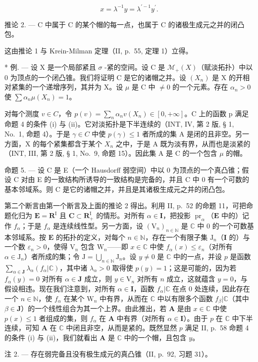 \[
x = \lambda^ {- 1} y = \lambda^ {\prime - 1} y ^ {\prime}.
\]

推论 2. --- C 中属于 C 的某个帽的每一点，也属于 C 的诸极生成元之并的闭凸包。

这由推论 1 与 Krein-Milman 定理（II, p.~55, 定理 1）立得。

* 例. --- 设 X 是一个局部紧且 \(\sigma\) -紧的空间。设 C 是 \(\mathcal{M}_{+}(X)\)（赋淡拓扑）中以 0 为顶点的一个闭凸锥。我们将证明 C 是它的诸帽之并。设 \((X_{n})\) 是 X 的开相对紧集的一个递增序列，其并为 X。设 \(\mu\) 是 C 中 \(\neq 0\) 的一个元素。存在 \(\alpha_{n} > 0\) 使 \(\sum \alpha_{n}\mu(X_{n}) = 1\)。

对每个测度 \(v \in C\)，令 \(p(v) = \sum_{n} \alpha_{n} v(X_{n}) \in [0, +\infty]\)。C 上的函数 p 满足命题 4 的条件 (i) 与 (ii)。它对淡拓扑是下半连续的（INT, IV, 第 2 版, § 1, No.~1, 命题 4）。于是 \(\gamma \in C\) 中使 \(p(\gamma) \leqslant 1\) 者所成的集 A 是闭的且非空。另一方面，X 的每个紧集都含于某个 \(X_{n}\) 之中，于是 A 既为淡有界，从而也是淡紧的（INT, III, 第 2 版, § 1, No.~9, 命题 15）。因此集 A 是 C 的一个包含 \(\mu\) 的帽。

命题 5. --- 设 C 是 E（一个 Hausdorff 弱空间）中以 0 为顶点的一个真凸锥；假设 C 对由 E 的一致结构所诱导的一致结构是完备的，并且 C 中 0 有一个可数的基本邻域系。则 C 是它的诸帽之并，并且是其诸极生成元之并的闭凸包。

第二个断言由第一个断言及上面的推论 2 得出。利用 II, p.~52 的命题 11，可把命题化归为 \(\mathbf{E} = \mathbf{R}^{\mathrm{I}}\) 且 \(\mathbf{C} \subset \mathbf{R}_{+}^{\mathrm{I}}\) 的情形。对所有 \(\alpha \in \mathbf{I}\)，把投影 \(\operatorname{pr}_{\alpha}\)（\(\mathbf{E}\) 中的）记作 \(f_{\alpha}\)；于是 \(f_{\alpha}\) 是连续线性型。另一方面，设 \((\mathrm{V}_n)_{n \in \mathbb{N}}\) 是 \(\mathbb{C}\) 中 0 的一个可数基本邻域系。按 \(\mathbf{E}\) 的拓扑的定义，对每个 \(n \in \mathbb{N}\)，存在一个有限子集 \(\mathrm{J}_n\)（\(\mathbf{I}\) 的）与一个数 \(\varepsilon_n > 0\)，使得 \(\mathrm{V}_n\) 包含 \(\mathrm{W}_n\)——即 \(x \in \mathbb{C}\) 中使 \(f_{\alpha}(x) \leqslant \varepsilon_n\)（对所有 \(\alpha \in \mathrm{J}_n\)）者所成的集；令 \(\mathrm{J} = \bigcup_{n \in \mathbb{N}} \mathrm{J}_n\)。设 \(y \neq 0\) 是 \(\mathbb{C}\) 中的一点，并设 \(p\) 是函数 \(\sum_{\alpha \in \mathbf{J}} \lambda_{\alpha}(f_{\alpha}|\mathbb{C})\)，其中诸 \(\lambda_{\alpha} > 0\) 取得使 \(p(y) = 1\)；这是可能的，因为若 \(f_{\alpha}(y) = 0\) 对所有 \(\alpha \in \mathbf{J}\) 成立，则 \(y \in \mathrm{V}_n\) 对所有 \(n\) 成立，这就蕴含 \(y = 0\)，与假设相违。现在我们注意到，对所有 \(\alpha \in \mathbf{I}\)，函数 \(f_{\alpha}|\mathbb{C}\) 在点 0 处连续，因此存在一个 \(n \in \mathbb{N}\)，使 \(f_{\alpha}\) 在某个 \(\mathrm{W}_n\) 中有界，从而在 \(\mathbb{C}\) 中以有限多个函数 \(f_{\beta}|\mathbb{C}\)（其中 \(\beta \in \mathbf{J}\)）的一个线性组合为其一个上界。由此推出，若 \(\mathbf{A}\) 是由 \(x \in \mathbb{C}\) 中使 \(p(x) \leqslant 1\) 者组成的集，则 \(f_{\alpha}\) 在 \(\mathbf{A}\) 中有界（对所有 \(\alpha \in \mathbf{I}\)）。由于 \(p\) 在 \(\mathbb{C}\) 中下半连续，可知 \(\mathbf{A}\) 在 \(\mathbb{C}\) 中闭且非空，从而是紧的。既然显然 \(p\) 满足 II, p.~58 命题 4 的条件 (i) 与 (ii)，我们就看出 \(\mathbf{A}\) 是 \(\mathbb{C}\) 中的一个帽，且包含 \(y\)。

注 2. --- 存在弱完备且没有极生成元的真凸锥（II, p.~92, 习题 31）。

